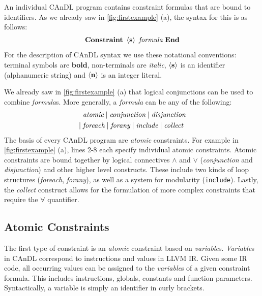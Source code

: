     An individual CAnDL program contains constraint formulas that are
    bound to identifiers.
    As we already saw in \autoref{fig:firstexample} (a), the syntax for this is
    as follows:
    \begin{align*}
        \text{\bf Constraint}\ \left<\text{\bf s}\right>\ \text{\it formula}\ \text{\bf End}
    \end{align*}
    For the description of CAnDL syntax we use these notational conventions:
    terminal symbols are {\bf bold}, non-terminals are {\it italic},
    $\left<\text{\bf s}\right>$ is an identifier (alphanumeric string) and
    $\left<\text{\bf n}\right>$ is an integer literal.

    We already saw in \autoref{fig:firstexample} (a) that logical conjunctions
    can be used to combine {\it formula}s.
    More generally, a {\it formula} can be any of the following:
    \begin{align*}
        &\text{\it atomic}\mid\text{\it conjunction}\mid \text{\it disjunction}\\
        \mid{}&{}\text{\it foreach}\mid \text{\it forany}\mid\text{\it include}\mid\text{\it collect}
    \end{align*}
    The basis of every CAnDL program are {\it atomic} constraints.
    For example in \autoref{fig:firstexample} (a), lines 2-8 each specify
    individual atomic constraints.
    Atomic constraints are bound together by logical connectives $\land$ and
    $\lor$ ({\it conjunction} and {\it disjunction}) and other higher level
    constructs.
    These include two kinds of loop structures ({\it foreach}, {\it forany}), as
    well as a system for modularity (\texttt{include}).
    Lastly, the {\it collect} construct allows for the formulation of more
    complex constraints that require the $\forall$ quantifier.

\subsection{Atomic Constraints}

    The first type of constraint is an {\it atomic} constraint based on
    {\it variable}s.
    {\it Variable}s in CAnDL correspond to instructions and values in LLVM IR. 
    Given some IR code, all occurring values can be assigned to the
    {\it variable}s of a given constraint formula.
    This includes instructions, globals, constants and function parameters.
    Syntactically, a variable is simply an identifier in curly brackets.

